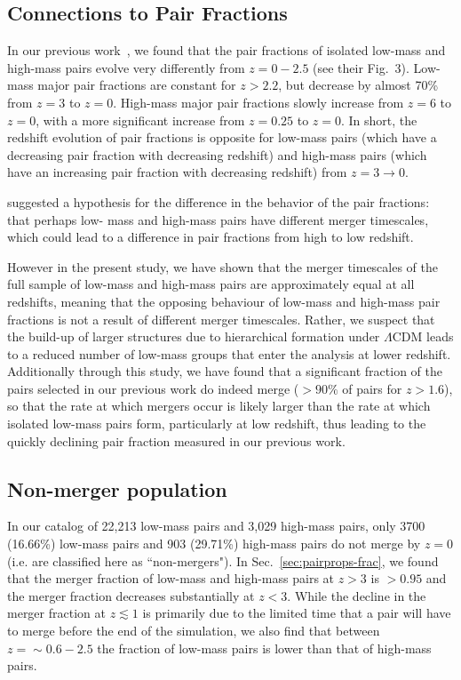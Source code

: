 \documentclass[twocolumn,linenumbers]{aastex631}
\newcommand{\chambe}{\citet{Chamberlain2024}}
\begin{document}
    \subsection{Connections to Pair Fractions}\label{sec:disc-pairfrac}
        In our previous work~\citep{Chamberlain2024}, we found that the pair fractions of isolated low-mass and high-mass pairs evolve very differently from $z=0-2.5$ (see their Fig.~3). 
        Low-mass major pair fractions are constant for $z>2.2$, but decrease by almost 70\% from $z=3$ to $z=0$. 
        High-mass major pair fractions slowly increase from $z=6$ to $z=0$, with a more significant increase from $z=0.25$ to $z=0$.
        In short, the redshift evolution of pair fractions is opposite for low-mass pairs (which have a decreasing pair fraction with decreasing redshift) and high-mass pairs (which have an increasing pair fraction with decreasing redshift) from $z=3\to0$.
    
        \chambe{} suggested a hypothesis for the difference in the behavior of the pair fractions:  that perhaps low- mass and high-mass pairs have different merger timescales, which could lead to a difference in pair fractions from high to low redshift.
        
        However in the present study, we have shown that the merger timescales of the full sample of low-mass and high-mass pairs are approximately equal at all redshifts, meaning that the opposing behaviour of low-mass and high-mass pair fractions is not a result of different merger timescales. 
        Rather, we suspect that the build-up of larger structures due to hierarchical formation under $\Lambda$CDM leads to a reduced number of low-mass groups that enter the analysis at lower redshift. 
        Additionally through this study, we have found that a significant fraction of the pairs selected in our previous work do indeed merge ($>90\%$ of pairs for $z>1.6$), so that the rate at which mergers occur is likely larger than the rate at which isolated low-mass pairs form, particularly at low redshift, thus leading to the quickly declining pair fraction measured in our previous work.
    

    \subsection{Non-merger population}\label{sec:disc-nonmergers}
        In our catalog of 22,213 low-mass pairs and 3,029 high-mass pairs, only 3700 (16.66\%) low-mass pairs and 903 (29.71\%) high-mass pairs do not merge by $z=0$ (i.e. are classified here as ``non-mergers").
        In Sec.~\ref{sec:pairprops-frac}, we found that the merger fraction of low-mass and high-mass pairs at $z>3$ is $>0.95$ and the merger fraction decreases substantially at $z<3$. 
        While the decline in the merger fraction at $z\lesssim1$ is primarily due to the limited time that a pair will have to merge before the end of the simulation, we also find that between $z=\sim0.6-2.5$ the fraction of low-mass pairs is lower than that of high-mass pairs. 
\end{document}
